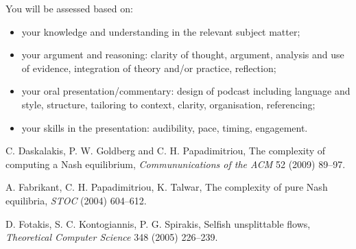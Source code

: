 \documentclass{article}
\begin{document}
\begin{itemize}
	You will be assessed based on:
	
	\begin{itemize}
		\item your knowledge and understanding in the relevant subject matter;
		\item your argument and reasoning: 	clarity of thought, argument, analysis and use of evidence, integration of theory and/or practice, reflection;
		\item your oral presentation/commentary: design of podcast including language and style, structure, tailoring to context, clarity, organisation, referencing;
		\item your skills in the presentation: audibility, pace, timing, engagement.
	\end{itemize}
\end{itemize}



\vfill

\begin{thebibliography}{99}

 C. Daskalakis, P. W. Goldberg and C. H. Papadimitriou, The complexity of computing a Nash equilibrium, \emph{Commununications of the ACM} 52 (2009) 89--97.


 A. Fabrikant, C. H. Papadimitriou, K. Talwar, The complexity of pure Nash equilibria, \emph{STOC} (2004) 604--612.

 D. Fotakis, S. C. Kontogiannis, P. G. Spirakis, Selfish unsplittable flows, \emph{Theoretical Computer Science} 348 (2005) 226--239.

\end{thebibliography}
\end{document}
